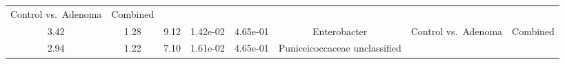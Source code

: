 \documentclass[12pt,]{article}
\begin{document}
\begin{longtable}[]{@{}cccccccc@{}}
\begin{minipage}[t]{0.14\columnwidth}
Control vs.~Adenoma\strut
\end{minipage} & \begin{minipage}[t]{0.09\columnwidth}\centering\strut
Combined\strut
\end{minipage}\tabularnewline
\begin{minipage}[t]{0.05\columnwidth}\centering\strut
3.42\strut
\end{minipage} & \begin{minipage}[t]{0.09\columnwidth}\centering\strut
1.28\strut
\end{minipage} & \begin{minipage}[t]{0.09\columnwidth}\centering\strut
9.12\strut
\end{minipage} & \begin{minipage}[t]{0.07\columnwidth}\centering\strut
1.42e-02\strut
\end{minipage} & \begin{minipage}[t]{0.07\columnwidth}\centering\strut
4.65e-01\strut
\end{minipage} & \begin{minipage}[t]{0.20\columnwidth}\centering\strut
Enterobacter\strut
\end{minipage} & \begin{minipage}[t]{0.14\columnwidth}\centering\strut
Control vs.~Adenoma\strut
\end{minipage} & \begin{minipage}[t]{0.09\columnwidth}\centering\strut
Combined\strut
\end{minipage}\tabularnewline
\begin{minipage}[t]{0.05\columnwidth}\centering\strut
2.94\strut
\end{minipage} & \begin{minipage}[t]{0.09\columnwidth}\centering\strut
1.22\strut
\end{minipage} & \begin{minipage}[t]{0.09\columnwidth}\centering\strut
7.10\strut
\end{minipage} & \begin{minipage}[t]{0.07\columnwidth}\centering\strut
1.61e-02\strut
\end{minipage} & \begin{minipage}[t]{0.07\columnwidth}\centering\strut
4.65e-01\strut
\end{minipage} & \begin{minipage}[t]{0.20\columnwidth}\centering\strut
Puniceicoccaceae unclassified\strut
\end{minipage} & \begin{minipage}[t]{0.14\columnwidth}\centering\strut

\end{minipage}
\end{longtable}
\end{document}
